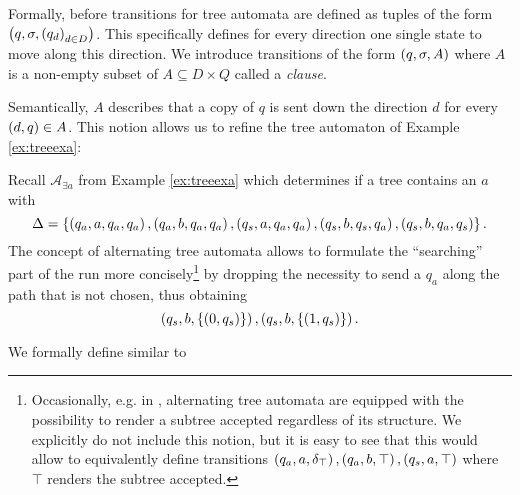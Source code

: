 Formally, before transitions for tree automata are defined as tuples of the 
form $\left(q, \sigma, \left(q_{d}\right)_{d\in D}\right)$. This specifically defines for
every direction one single state to move along this direction. We introduce
transitions of the form $\left(q,\sigma,A\right)$ where $A$ is a non-empty subset of 
$A\subseteq D\times Q$ called a \emph{clause}.

Semantically, $A$ describes that a copy of $q$ is sent down the direction $d$ 
for every $\left(d,q\right)\in A$. This notion allows us to refine the tree 
automaton of Example \ref{ex:treeexa}:
\begin{example}
  Recall $\mathcal{A}_{\exists a}$ from Example \ref{ex:treeexa} which
  determines if a tree contains an $a$ with 
  \begin{equation*}
    \Delta = \left\{
      \left(q_{a}, a, q_{a}, q_{a}\right),
      \left(q_{a}, b, q_{a}, q_{a}\right),
      \left(q_{s}, a, q_{a}, q_{a}\right),
      \left(q_{s}, b, q_{s}, q_{a}\right),
      \left(q_{s}, b, q_{a}, q_{s}\right)
    \right\}.
  \end{equation*}
  The concept of alternating tree automata allows to formulate the
  \enquote{searching} part of the run more concisely\footnote{
    Occasionally, e.g. in \cite[Chapter 9]{AutoLogInfGames}, alternating tree
    automata are equipped with the possibility to render a subtree accepted 
    regardless of its structure. We explicitly do not include this notion, but 
    it is easy to see that this would allow to equivalently define transitions
    $\left(q_{a}, a, \delta_{\top}\right),\left(q_{a}, b, \top\right),
    \left(q_{s}, a, \top\right)$ where $\top$ renders the subtree accepted.
  }
  by dropping the necessity to send a $q_{a}$ along the
  path that is not chosen, thus obtaining
  \begin{equation*}
    \left(q_{s}, b, \left\{\left(0, q_{s}\right)\right\}\right),
    \left(q_{s}, b, \left\{\left(1, q_{s}\right)\right\}\right).
  \end{equation*}
\end{example}
We formally define similar to \cite{SynProbEnv}
